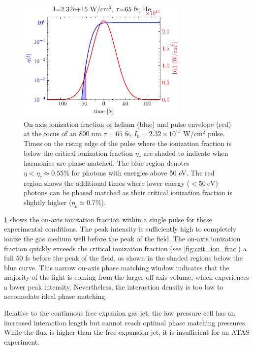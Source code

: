 \begin{figure}
	\centering
	\includegraphics[width=0.75\textwidth]{figures/chap3/eta_vs_t_He800_2.32e15Wcm2.pdf}
	\caption{On-axis ionization fraction of helium (blue) and pulse envelope (red) at the focus of an 800 nm $\tau = 65$ fs, $I_0 = 2.32 \times 10^{15}$ W/cm$^2$ pulse. Times on the rising edge of the pulse where the ionization fraction is below the critical ionization fraction $\eta_c$ are shaded to indicate when harmonics are phase matched. The blue region denotes $\eta < \eta_c \simeq 0.55\%$ for photons with energies above 50 eV. The red region shows the additional times where lower energy ($< 50 \ \textrm{eV}$) photons can be phased matched as their critical ionization fraction is slightly higher ($\eta_c \simeq 0.7\%$).}
	\label{fig:eta_vs_t_He800_2.32e15Wcm2}
\end{figure}

\cref{fig:eta_vs_t_He800_2.32e15Wcm2} shows the on-axis ionization fraction within a single pulse for these experimental conditions. The peak intensity is sufficiently high to completely ionize the gas medium well before the peak of the field. The on-axis ionization fraction quickly exceeds the critical ionization fraction (see \cref{fig:crit_ion_frac}) a full 50 fs before the peak of the field, as shown in the shaded regions below the blue curve. This narrow on-axis phase matching window indicates that the majority of the light is coming from the larger off-axis volume, which experiences a lower peak intensity. Nevertheless, the interaction density is too low to accomodate ideal phase matching.

Relative to the continuous free expanion gas jet, the low pressure cell has an increased interaction length but cannot reach optimal phase matching pressures. While the flux is higher than the free expansion jet, it is insufficient for an ATAS experiment.

